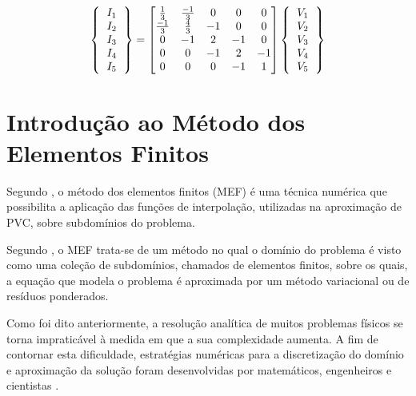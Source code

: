 \documentclass[
    12pt,               %
    openright,          %
    oneside,
    a4paper,            %
    english,            %
    french,             %
    spanish,            %
    brazil              %
    ]{abntex2}
\begin{document}
    \begin{equation}
       \label{eq:mapFinal}
  	\left \{
       \begin{tabular}{c}
           $I_1$ \\
           $I_2$ \\
           $I_3$ \\
           $I_4$ \\
           $I_5$          
       \end{tabular}       
       \right \}
       =
  	  \begin{bmatrix}
  	         \frac{1}{3} & \frac{-1}{3}  & 0 & 0 & 0 \\
  	         \frac{-1}{3} & \frac{4}{3}  & -1 & 0 & 0 \\
  	         0 & -1 & 2 & -1 & 0 \\
  	         0 & 0 & -1 & 2 & -1 \\
  	         0 & 0 & 0 & -1 & 1 \\
  	     \end{bmatrix} 
  	\left \{
       \begin{tabular}{c}
           $V_1$ \\
           $V_2$ \\
           $V_3$ \\
           $V_4$ \\
           $V_5$          
       \end{tabular}       
       \right \}	                     
    \end{equation}

\section{Introdução ao Método dos Elementos Finitos}
\label{sec:MEF}

Segundo , o método dos elementos finitos (MEF) é uma técnica numérica que possibilita a aplicação das funções de interpolação, utilizadas na aproximação de PVC, sobre subdomínios do problema.

Segundo , o MEF trata-se de um método no qual o domínio do problema é visto como uma coleção de subdomínios, chamados de elementos finitos, sobre os quais, a equação que modela o problema é aproximada por um método variacional ou de resíduos ponderados.



Como foi dito anteriormente, a resolução analítica de muitos problemas físicos se torna impraticável à medida em que a sua  complexidade aumenta. 
A fim de contornar esta dificuldade, estratégias numéricas para a discretização do domínio e aproximação da solução foram desenvolvidas por matemáticos, engenheiros e cientistas \cite[p. 1]{zien}. 
\end{document}
